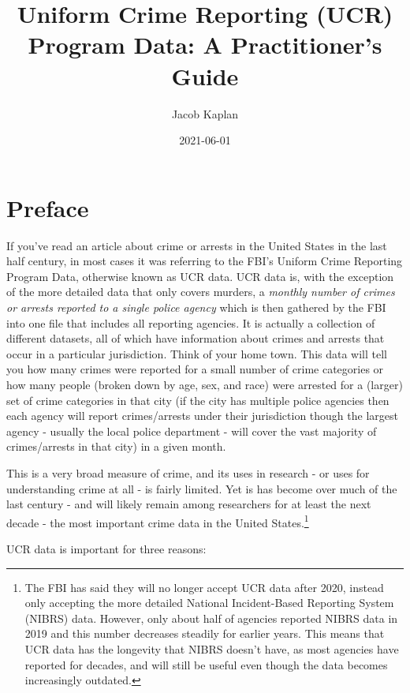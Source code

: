 \documentclass[
  12pt,
  openany]{book}
\title{Uniform Crime Reporting (UCR) Program Data: A Practitioner's Guide}
\author{Jacob Kaplan}
\date{2021-06-01}
\begin{document}
\maketitle

{
\hypersetup{linkcolor=}
\setcounter{tocdepth}{2}
\tableofcontents
}
\listoffigures
{}
\hypertarget{preface}{%
\chapter{Preface}\label{preface}}

If you've read an article about crime or arrests in the United States in the last half century, in most cases it was referring to the FBI's Uniform Crime Reporting Program Data, otherwise known as UCR data. UCR data is, with the exception of the more detailed data that only covers murders, a \emph{monthly number of crimes or arrests reported to a single police agency} which is then gathered by the FBI into one file that includes all reporting agencies. It is actually a collection of different datasets, all of which have information about crimes and arrests that occur in a particular jurisdiction. Think of your home town. This data will tell you how many crimes were reported for a small number of crime categories or how many people (broken down by age, sex, and race) were arrested for a (larger) set of crime categories in that city (if the city has multiple police agencies then each agency will report crimes/arrests under their jurisdiction though the largest agency - usually the local police department - will cover the vast majority of crimes/arrests in that city) in a given month.

This is a very broad measure of crime, and its uses in research - or uses for understanding crime at all - is fairly limited. Yet is has become over much of the last century - and will likely remain among researchers for at least the next decade - the most important crime data in the United States.\footnote{The FBI has said they will no longer accept UCR data after 2020, instead only accepting the more detailed National Incident-Based Reporting System (NIBRS) data. However, only about half of agencies reported NIBRS data in 2019 and this number decreases steadily for earlier years. This means that UCR data has the longevity that NIBRS doesn't have, as most agencies have reported for decades, and will still be useful even though the data becomes increasingly outdated.}

UCR data is important for three reasons:
\end{document}
